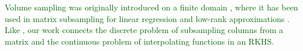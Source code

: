 \documentclass[twoside,11pt]{book}
\newcommand{\rev}[1]{\textcolor{darkgreen}{#1}}
\numberwithin{theorem}{chapter}
\numberwithin{definition}{chapter}
\numberwithin{proposition}{chapter}
\numberwithin{corollary}{chapter}
\numberwithin{example}{chapter}
\numberwithin{lemma}{chapter}
\numberwithin{assumption}{chapter}
\begin{document}
\rev{
Volume sampling was originally introduced on a finite domain \citep{DRVW06}, where it has been used in matrix subsampling for linear regression and low-rank approximations \citep{DeWa17,BeBaCh18}. Like \citep{BeBaCh19}, our work connects the discrete problem of subsampling columns from a matrix and the continuous problem of interpolating functions in an RKHS.
}











\end{document}
